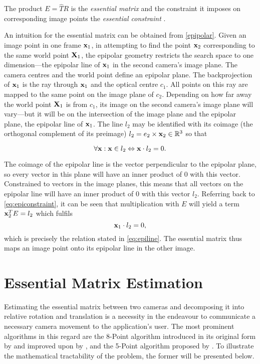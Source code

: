 The product $E=\widehat{T}R$ is the \emph{essential matrix} and the constraint it
imposes on corresponding image points the \emph{essential constraint}
\citep[see][ch. 5]{ma2003}. 

An intuition for the essential matrix can be
obtained from \autoref{epipolar}. Given an image point in one frame $\mathbf{x}_1$,
in attempting to find the point $\mathbf{x}_2$ corresponding to the same world
point $\mathbf{X}_1$, the epipolar geometry restricts the search space to one
dimension---the epipolar line of $\mathbf{x}_1$ in the second camera's image plane.
The camera centres and the world point define an epipolar plane. The
backprojection of $\mathbf{x}_1$ is the ray through $\mathbf{x}_1$ and the optical
centre $c_1$. All points on this ray are mapped to the same point on the image
plane of $c_2$. Depending on how far away the world point $\mathbf{X}_1$ is from $c_1$, its
image on the second camera's image plane will vary---but it will be on the
intersection of the image plane and the epipolar plane, the epipolar line of
$\mathbf{x}_1$. The line $l_2$ may be identified with its coimage (the orthogonal
complement of its preimage) $l_2 = e_2 \times \mathbf{x}_2 \in \mathbb{R}^3$ so that

\begin{equation} \label{eq:epiline}
   \forall\mathbf{x}: \mathbf{x}\in l_2 \Leftrightarrow \mathbf{x}\cdot l_2 = 0.
\end{equation} 

The coimage of the epipolar line is the vector perpendicular to the epipolar plane,
so every vector in this plane will have an inner product of $0$ with this
vector. Constrained to vectors in the image planes, this means that all vectors on the
epipolar line will have an inner product of $0$ with this vector $l_2$.
Referring back to \eqref{eq:epiconstraint}, it can be seen that multiplication
with $E$ will yield a term $\mathbf{x}_2^TE = l_2$ which fulfils 
\begin{equation}
   \mathbf{x}_1 \cdot l_2 = 0,
\end{equation}
which is precisely the relation stated in \eqref{eq:epiline}. The essential
matrix thus maps an image point onto its epipolar line in the other image.

\section{Essential Matrix Estimation}

Estimating the essential matrix between two
cameras and decomposing it into relative rotation and translation is a necessity
in the endeavour to communicate a necessary camera movement to the application's
user. The most prominent algorithms in this regard are the 8-Point algorithm
introduced in its original form by \citet{longuet-higgins1987} and improved upon
by \citet{hartley1997}, and the 5-Point algorithm proposed by
\citet{nister2004}. To illustrate the mathematical tractability of the problem,
the former will be presented below.

